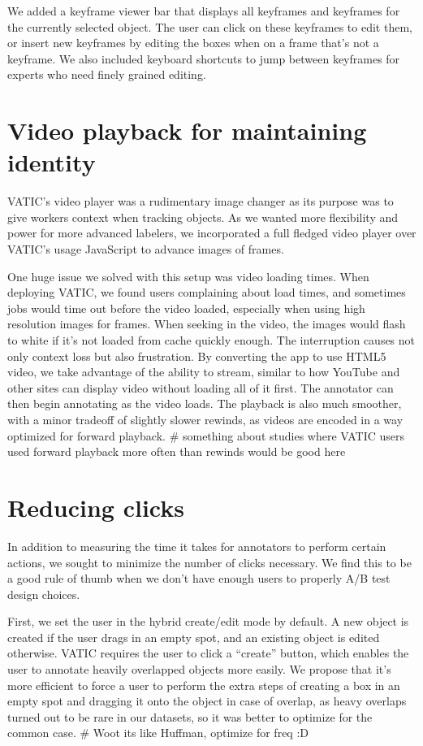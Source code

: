 We added a keyframe viewer bar that displays all keyframes and keyframes for the currently selected object.
The user can click on these keyframes to edit them, or insert new keyframes by editing the boxes when on a frame that's not a keyframe.
We also included keyboard shortcuts to jump between keyframes for experts who need finely grained editing.

\section{Video playback for maintaining identity}

VATIC's video player was a rudimentary image changer as its purpose was to give workers context when tracking objects.
As we wanted more flexibility and power for more advanced labelers, we incorporated a full fledged video player over VATIC's usage JavaScript to advance images of frames.

One huge issue we solved with this setup was video loading times.
When deploying VATIC, we found users complaining about load times, and sometimes jobs would time out before the video loaded, especially when using high resolution images for frames.
When seeking in the video, the images would flash to white if it's not loaded from cache quickly enough. The interruption causes not only context loss but also frustration.
By converting the app to use HTML5 video, we take advantage of the ability to stream, similar to how YouTube and other sites can display video without loading all of it first.
The annotator can then begin annotating as the video loads.
The playback is also much smoother, with a minor tradeoff of slightly slower rewinds, as videos are encoded in a way optimized for forward playback. # something about studies where VATIC users used forward playback more often than rewinds would be good here

\section{Reducing clicks}

In addition to measuring the time it takes for annotators to perform certain actions, we sought to minimize the number of clicks necessary.
We find this to be a good rule of thumb when we don't have enough users to properly A/B test design choices.

First, we set the user in the hybrid create/edit mode by default.
A new object is created if the user drags in an empty spot, and an existing object is edited otherwise.
VATIC requires the user to click a ``create'' button, which enables the user to annotate heavily overlapped objects more easily.
We propose that it's more efficient to force a user to perform the extra steps of creating a box in an empty spot and dragging it onto the object in case of overlap,
as heavy overlaps turned out to be rare in our datasets, so it was better to optimize for the common case. # Woot its like Huffman, optimize for freq :D

